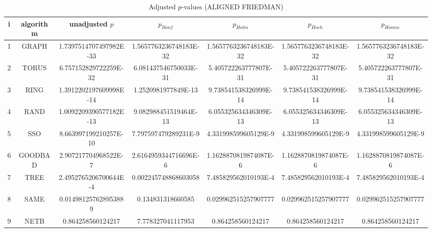 \documentclass[a4paper,10pt]{article}
\begin{document}
\begin{landscape}
\begin{table}[!htp]
\centering\scriptsize
\caption{Adjusted $p$-values (ALIGNED FRIEDMAN)}
\begin{tabular}{ccccccc}
i&algorithm&unadjusted $p$&$p_{Bonf}$&$p_{Holm}$&$p_{Hoch}$&$p_{Homm}$\\
\hline
1& GRAPH&1.7397514707497982E-33&1.5657763236748183E-32&1.5657763236748183E-32&1.5657763236748183E-32&1.5657763236748183E-32\\
2& TORUS&6.757152829722259E-32&6.081437546750033E-31&5.405722263777807E-31&5.405722263777807E-31&5.405722263777807E-31\\
3& RING&1.3912202197609998E-14&1.2520981977849E-13&9.738541538326999E-14&9.738541538326999E-14&9.738541538326999E-14\\
4& RAND&1.0092209390577182E-13&9.082988451519464E-13&6.055325634346309E-13&6.055325634346309E-13&6.055325634346309E-13\\
5& SSO&8.663997199210257E-10&7.797597479289231E-9&4.331998599605129E-9&4.331998599605129E-9&4.331998599605129E-9\\
6& GOODBAD&2.907217704968522E-7&2.6164959344716696E-6&1.1628870819874087E-6&1.1628870819874087E-6&1.1628870819874087E-6\\
7& TREE&2.4952765206700644E-4&0.002245748868603058&7.485829562010193E-4&7.485829562010193E-4&7.485829562010193E-4\\
8& SAME&0.014981257628953889&0.134831318660585&0.029962515257907777&0.029962515257907777&0.029962515257907777\\
9& NETB&0.864258560124217&7.778327041117953&0.864258560124217&0.864258560124217&0.864258560124217\\
\hline
\end{tabular}
\end{table}


\end{landscape}
\end{document}
